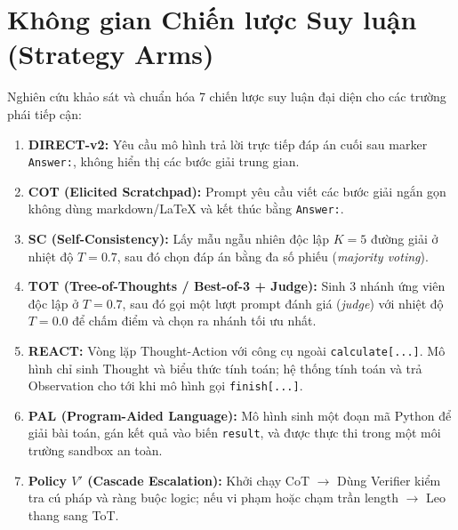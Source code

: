 \documentclass[11pt,a4paper]{report}
\begin{document}
\section{Không gian Chiến lược Suy luận (Strategy Arms)}
Nghiên cứu khảo sát và chuẩn hóa 7 chiến lược suy luận đại diện cho các trường phái tiếp cận:
\begin{enumerate}[leftmargin=*]
    \item \textbf{DIRECT-v2:} Yêu cầu mô hình trả lời trực tiếp đáp án cuối sau marker \texttt{Answer:}, không hiển thị các bước giải trung gian.
    \item \textbf{COT (Elicited Scratchpad):} Prompt yêu cầu viết các bước giải ngắn gọn không dùng markdown/LaTeX và kết thúc bằng \texttt{Answer:}.
    \item \textbf{SC (Self-Consistency):} Lấy mẫu ngẫu nhiên độc lập $K=5$ đường giải ở nhiệt độ $T=0.7$, sau đó chọn đáp án bằng đa số phiếu (\textit{majority voting}).
    \item \textbf{TOT (Tree-of-Thoughts / Best-of-3 + Judge):} Sinh 3 nhánh ứng viên độc lập ở $T=0.7$, sau đó gọi một lượt prompt đánh giá (\textit{judge}) với nhiệt độ $T=0.0$ để chấm điểm và chọn ra nhánh tối ưu nhất.
    \item \textbf{REACT:} Vòng lặp Thought-Action với công cụ ngoài \texttt{calculate[...]}. Mô hình chỉ sinh Thought và biểu thức tính toán; hệ thống tính toán và trả Observation cho tới khi mô hình gọi \texttt{finish[...]}.
    \item \textbf{PAL (Program-Aided Language):} Mô hình sinh một đoạn mã Python để giải bài toán, gán kết quả vào biến \texttt{result}, và được thực thi trong một môi trường sandbox an toàn.
    \item \textbf{Policy $V'$ (Cascade Escalation):} Khởi chạy CoT $\to$ Dùng Verifier kiểm tra cú pháp và ràng buộc logic; nếu vi phạm hoặc chạm trần length $\to$ Leo thang sang ToT.
\end{enumerate}
\end{document}
